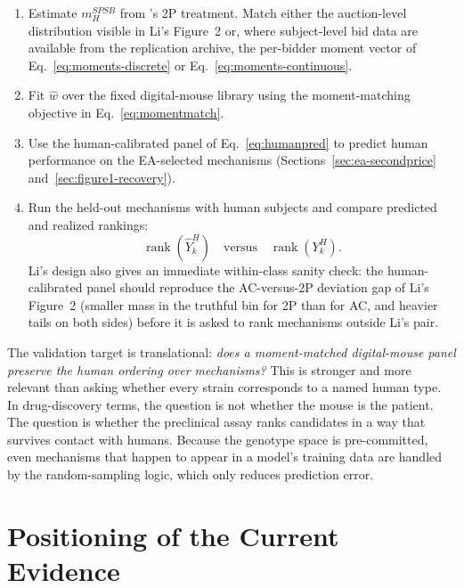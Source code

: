 \documentclass[12pt]{article}
\newcommand{\SPSB}{SPSB}
\begin{document}
\begin{enumerate}
\item Estimate $m_H^{\SPSB}$ from \citet{li2017}'s 2P treatment.
Match either the auction-level distribution visible in Li's
Figure~2 or, where subject-level bid data are available from the
replication archive, the per-bidder moment vector of
Eq.~\eqref{eq:moments-discrete} or Eq.~\eqref{eq:moments-continuous}.
\item Fit $\widehat{w}$ over the fixed digital-mouse library using the
moment-matching objective in Eq.~\eqref{eq:momentmatch}.
\item Use the human-calibrated panel of Eq.~\eqref{eq:humanpred} to
predict human performance on the EA-selected mechanisms
(Sections~\ref{sec:ea-secondprice} and~\ref{sec:figure1-recovery}).
\item Run the held-out mechanisms with human subjects and compare
predicted and realized rankings:
\begin{equation}
\operatorname{rank}\!\left(\widehat{Y}^{H}_k\right)
\quad\text{versus}\quad
\operatorname{rank}\!\left(Y^{H}_k\right).
\label{eq:rankval}
\end{equation}
Li's design also gives an immediate within-class sanity check: the
human-calibrated panel should reproduce the AC-versus-2P deviation
gap of Li's Figure~2 (smaller mass in the truthful bin for 2P than
for AC, and heavier tails on both sides) before it is asked to rank
mechanisms outside Li's pair.
\end{enumerate}

The validation target is translational: \emph{does a moment-matched
digital-mouse panel preserve the human ordering over mechanisms?}
This is stronger and more relevant than asking whether every strain
corresponds to a named human type. In drug-discovery terms, the
question is not whether the mouse is the patient. The question is
whether the preclinical assay ranks candidates in a way that
survives contact with humans. Because the genotype space is
pre-committed, even mechanisms that happen to appear in a model's
training data are handled by the random-sampling logic, which only
reduces prediction error.

\section{Positioning of the Current Evidence}
\label{sec:positioning}
\end{document}

